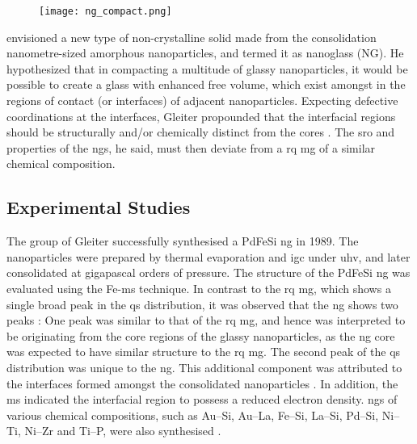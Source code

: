 \begin{figure}[!h] \centering
	\texttt{[image: ng\_compact.png]}
	\label{f:ng-sch}
\end{figure}

\textcite{Gleiter1991} envisioned a new type of non-crystalline solid made from the  consolidation nanometre-sized amorphous nanoparticles, and termed it as nanoglass (NG). He hypothesized that in compacting a multitude of glassy nanoparticles, it would be possible to create a glass with enhanced free volume, which exist amongst in the regions of contact (or interfaces) of adjacent nanoparticles. Expecting defective coordinations at the interfaces, 
Gleiter propounded that the interfacial regions should be structurally and/or chemically distinct from the cores \cite{Gleiter1991, Gleiter1995}. The \gls{sro} and properties of the \gls{ng}s, he said, must then deviate from a \gls{rq} \gls{mg} of a similar chemical composition. \par

\subsection{Experimental Studies}
The group of Gleiter successfully synthesised a PdFeSi \gls{ng} \cite{Jing1989} in 1989. The nanoparticles were prepared by thermal evaporation and \gls{igc} under \gls{uhv}, and later consolidated at gigapascal orders of pressure. The structure of the PdFeSi \gls{ng} was evaluated using the Fe-\gls{ms} technique. In contrast to the \gls{rq} \gls{mg}, which shows a single broad peak in the \gls{qs} distribution, it was observed that the \gls{ng} shows two peaks \cite{Jing1989}: One peak was similar to that of the \gls{rq} \gls{mg}, and hence was interpreted to be originating from the core regions of the glassy nanoparticles, as the \gls{ng} core was expected to have similar structure to the \gls{rq} \gls{mg}. The second peak of the \gls{qs} distribution was unique to the \gls{ng}. This additional component was attributed to the interfaces formed amongst the consolidated nanoparticles \cite{Jing1989}. In addition, the \gls{ms} indicated the interfacial region to possess a reduced electron density. \gls{ng}s of various chemical compositions, such as Au–Si, Au–La, Fe–Si, La–Si, Pd–Si, Ni–Ti, Ni–Zr and Ti–P, were also synthesised \cite{Weissmuller1992}. \par

